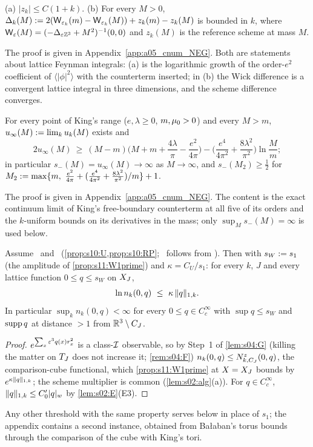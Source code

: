 \begin{lemma}[$c$-numbers]\label{lem:k02:cnum}
\textup{(a)} $|z_k|\le C(1+k)$. \textup{(b)} For every $M>0$, $\Delta_k(M):=2(\mathsf W_{\varepsilon_k}(m)-\mathsf W_{\varepsilon_k}(M))+z_k(m)-z_k(M)$ is bounded in $k$, where $\mathsf W_{\varepsilon}(M)=(-\Delta_{\varepsilon\mathbb Z^3}+M^2)^{-1}(0,0)$ and $z_k(M)$ is the reference scheme at mass $M$.
\end{lemma}
The proof is given in Appendix~\ref{app:a05_cnum_NEG}. Both are statements about lattice Feynman integrals: (a) is the logarithmic growth of the order-$e^2$ coefficient of $\langle|\phi|^2\rangle$ with the counterterm inserted; in (b) the Wick difference is a convergent lattice integral in three dimensions, and the scheme difference converges.

\begin{proposition}\label{prop:k02:NEG}
For every point of King's range ($e,\lambda\ge0$, $m,\mu_0>0$) and every $M>m$, $u_\infty(M):=\lim_ku_k(M)$ exists and
\[
2u_\infty(M)\ \ge\ (M-m)\Big(M+m+\frac{4\lambda}{\pi}-\frac{e^2}{4\pi}\Big)-\Big(\frac{e^4}{4\pi^2}+\frac{8\lambda^2}{\pi^2}\Big)\ln\frac Mm ;
\]
in particular $s_-(M)=u_\infty(M)\to\infty$ as $M\to\infty$, and $s_-(M_2)\ge\frac12$ for $M_2\defeq\max\{m,\ \frac{e^2}{4\pi}+(\frac{e^4}{4\pi^2}+\frac{8\lambda^2}{\pi^2})/m\}+1$.
\end{proposition}
The proof is given in Appendix~\ref{app:a05_cnum_NEG}. The content is the exact continuum limit of King's free-boundary counterterm at all five of its orders and the $k$-uniform bounds on its derivatives in the mass; only $\sup_Ms_-(M)=\infty$ is used below.

\begin{proposition}\label{prop:k02:Wsharp}
Assume \Itwo\ and \Ithree\ (\cref{prop:s10:U,prop:s10:RP}; \Itwo\ follows from \Tall). Then with $s_W:= s_1$ (the amplitude of \cref{prop:s11:W1prime}) and $\kappa=C_U/s_1$: for every $k$, $J$ and every lattice function $0\le q\le s_W$ on $X_J$,
\[
\ln n_k(0,q)\ \le\ \kappa\,\lVert q\rVert_{1,k}.
\]
In particular $\sup_kn_k(0,q)<\infty$ for every $0\le q\in C^\infty_c$ with $\sup q\le s_W$ and $\operatorname{supp} q$ at distance $>1$ from $\mathbb R^3\setminus C_J$.
\end{proposition}
\begin{proof}
$e^{\sum_x\varepsilon^3q(x)r_x^2}$ is a class-$\mathcal I$ observable, so by Step~1 of \cref{lem:s04:G} (killing the matter on $T_J$ does not increase it; \cref{rem:s04:F}) $n_k(0,q)\le N^z_{k,C_J}(0,q)$, the comparison-cube functional, which \cref{prop:s11:W1prime} at $X=X_J$ bounds by $e^{\kappa\lVert q\rVert_{1,k}}$; the scheme multiplier is common (\cref{lem:s02:alg}(a)). For $q\in C^\infty_c$, $\lVert q\rVert_{1,k}\le C_0'\lvert q\rvert_{w}$ by \cref{lem:s02:E}(E3).
\end{proof}
Any other threshold with the same property serves below in place of $s_1$; the appendix contains a second instance, obtained from Ba{\l}aban's torus bounds through the comparison of the cube with King's tori.

